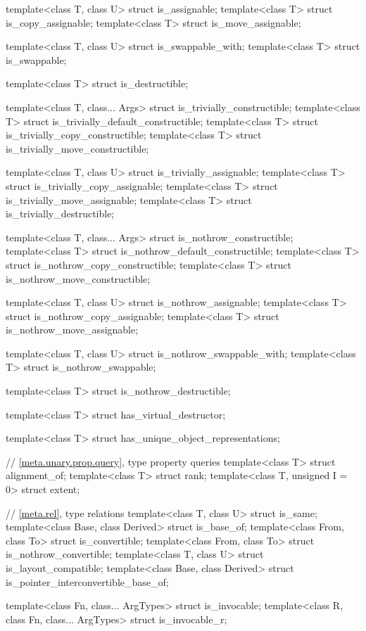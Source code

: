 \begin{codeblock}
{  template<class T, class U> struct is_assignable;
  template<class T> struct is_copy_assignable;
  template<class T> struct is_move_assignable;

  template<class T, class U> struct is_swappable_with;
  template<class T> struct is_swappable;

  template<class T> struct is_destructible;

  template<class T, class... Args> struct is_trivially_constructible;
  template<class T> struct is_trivially_default_constructible;
  template<class T> struct is_trivially_copy_constructible;
  template<class T> struct is_trivially_move_constructible;

  template<class T, class U> struct is_trivially_assignable;
  template<class T> struct is_trivially_copy_assignable;
  template<class T> struct is_trivially_move_assignable;
  template<class T> struct is_trivially_destructible;

  template<class T, class... Args> struct is_nothrow_constructible;
  template<class T> struct is_nothrow_default_constructible;
  template<class T> struct is_nothrow_copy_constructible;
  template<class T> struct is_nothrow_move_constructible;

  template<class T, class U> struct is_nothrow_assignable;
  template<class T> struct is_nothrow_copy_assignable;
  template<class T> struct is_nothrow_move_assignable;

  template<class T, class U> struct is_nothrow_swappable_with;
  template<class T> struct is_nothrow_swappable;

  template<class T> struct is_nothrow_destructible;

  template<class T> struct has_virtual_destructor;

  template<class T> struct has_unique_object_representations;

  // \ref{meta.unary.prop.query}, type property queries
  template<class T> struct alignment_of;
  template<class T> struct rank;
  template<class T, unsigned I = 0> struct extent;

  // \ref{meta.rel}, type relations
  template<class T, class U> struct is_same;
  template<class Base, class Derived> struct is_base_of;
  template<class From, class To> struct is_convertible;
  template<class From, class To> struct is_nothrow_convertible;
  template<class T, class U> struct is_layout_compatible;
  template<class Base, class Derived> struct is_pointer_interconvertible_base_of;

  template<class Fn, class... ArgTypes> struct is_invocable;
  template<class R, class Fn, class... ArgTypes> struct is_invocable_r;

}
\end{codeblock}
